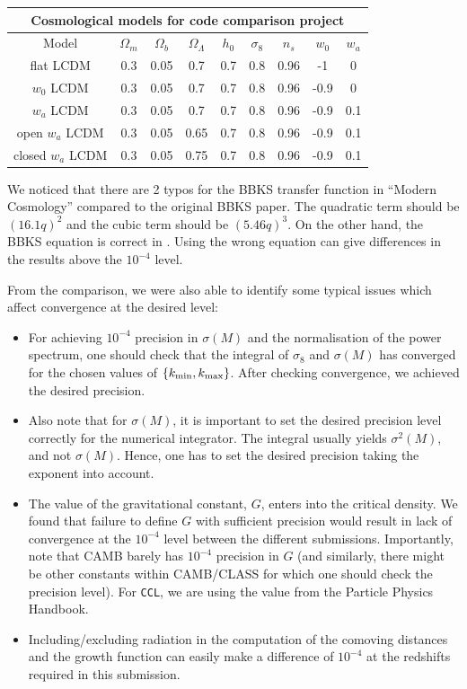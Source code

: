 \documentclass[\docopts]{\docclass}
\begin{document}
\begin{center}
  \begin{tabular}{ c | c c c c c c c c }
    \hline
    \multicolumn{9}{|c|}{Cosmological models for code comparison project} \\
    \hline
    \hline
    Model & $\Omega_m$ & $\Omega_b$ & $\Omega_\Lambda$ & $h_0$ & $\sigma_8$ & $n_s$ & $w_0$ & $w_a$ \\
    \hline
    flat LCDM & 0.3 & 0.05 & 0.7 & 0.7 & 0.8 & 0.96 & -1 & 0 \\ 
    $w_0$ LCDM & 0.3 & 0.05 & 0.7 & 0.7 & 0.8 & 0.96 & -0.9 & 0  \\ 
    $w_a$ LCDM & 0.3 & 0.05 & 0.7 & 0.7 & 0.8 & 0.96 & -0.9 & 0.1  \\ 
    open $w_a$ LCDM & 0.3 & 0.05 & 0.65 & 0.7 & 0.8 & 0.96 & -0.9 & 0.1  \\ 
    closed $w_a$ LCDM & 0.3 & 0.05 & 0.75 & 0.7 & 0.8 & 0.96 & -0.9 & 0.1  \\
    \hline
  \end{tabular}
\end{center}

We noticed that there are 2 typos for the BBKS transfer function in ``Modern Cosmology'' \citep{DodelsonBook} compared to the original BBKS paper. The quadratic term should be $(16.1q)^2$ and the cubic term should be $(5.46q)^3$. On the other hand, the BBKS equation is correct in \citet{PeacockBook}. Using the wrong equation can give differences in the results above the $10^{-4}$ level.

From the comparison, we were also able to identify some typical issues which affect convergence at the desired level:
\begin{itemize}
\item For achieving $10^{-4}$ precision in $\sigma(M)$ and the normalisation of the power spectrum, one should check that the integral of $\sigma_8$ and $\sigma(M)$ has converged for the chosen values of $\{k_{\rm min},k_{\rm max}\}$. After checking convergence, we achieved the desired precision.
\item Also note that for $\sigma(M)$, it is important to set the desired precision level correctly for the numerical integrator. The integral usually yields $\sigma^2(M)$, and not $\sigma(M)$. Hence, one has to set the desired precision taking the exponent into account.
\item The value of the gravitational constant, $G$, enters into the critical density. We found that failure to define $G$ with sufficient precision would result in lack of convergence at the $10^{-4}$ level between the different submissions. Importantly, note that CAMB barely has $10^{-4}$ precision in $G$ (and similarly, there might be other constants within CAMB/CLASS for which one should check the precision level). For {\tt CCL}, we are using the value from the Particle Physics Handbook. %
\item Including/excluding radiation in the computation of the comoving distances and the growth function can easily make a difference of $10^{-4}$ at the redshifts required in this submission.
\end{itemize}
\end{document}
